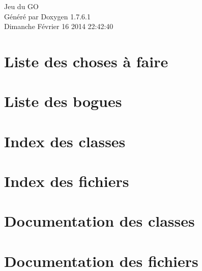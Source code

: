 \documentclass[a4paper]{book}
\begin{document}
\hypersetup{pageanchor=false,citecolor=blue}
\begin{titlepage}
\vspace*{7cm}
\begin{center}
{\Large \-Jeu du \-G\-O }\\
\vspace*{1cm}
{\large \-Généré par Doxygen 1.7.6.1}\\
\vspace*{0.5cm}
{\small Dimanche Février 16 2014 22:42:40}\\
\end{center}
\end{titlepage}
\clearemptydoublepage
{}
\tableofcontents
\clearemptydoublepage
{}
\hypersetup{pageanchor=true,citecolor=blue}
\chapter{\-Liste des choses à faire}
\label{todo}
\hypertarget{todo}{}

\chapter{\-Liste des bogues}
\label{bug}
\hypertarget{bug}{}

\chapter{\-Index des classes}

\chapter{\-Index des fichiers}

\chapter{\-Documentation des classes}







\chapter{\-Documentation des fichiers}



































\printindex
\end{document}
